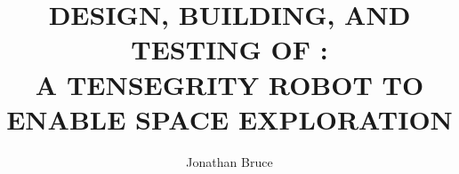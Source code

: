 \title{DESIGN, BUILDING, AND TESTING OF \SB{}:\\ A TENSEGRITY ROBOT TO ENABLE SPACE EXPLORATION}
\author{Jonathan Bruce}

\maketitle
